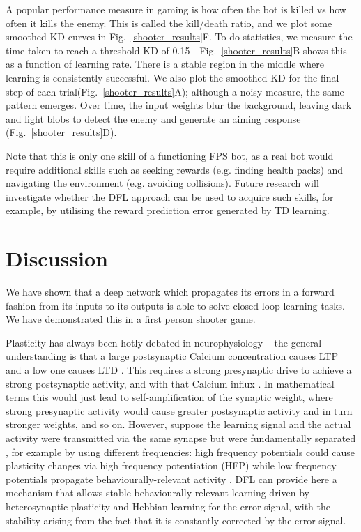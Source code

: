 \documentclass{article}
\begin{document}
A popular performance measure in gaming is how often the bot is killed
vs how often it kills the enemy. This is called the kill/death ratio,
and we plot some smoothed KD curves in Fig.~\ref{shooter_results}F. To
do statistics, we measure the time taken to reach a threshold KD of
0.15 - Fig.~\ref{shooter_results}B shows this as a function of
learning rate. There is a stable region in the middle where
learning is consistently successful. We also plot the smoothed KD for
the final step of each trial(Fig.~\ref{shooter_results}A); although a
noisy measure, the same pattern emerges. Over time, the input weights
blur the background, leaving dark and light blobs to detect the enemy
and generate an aiming response (Fig.~\ref{shooter_results}D).

Note that this is only one skill of a functioning FPS bot, as a real
bot would require additional skills such as seeking rewards
(e.g. finding health packs) and navigating the environment
(e.g. avoiding collisions). Future research will investigate whether
the DFL approach can be used to acquire such skills, for example,
by utilising the reward prediction error generated by TD learning.


\section{Discussion}
We have shown that a deep network which propagates its errors in a
forward fashion from its inputs to its outputs is able to solve closed
loop learning tasks. We have demonstrated this in a first person
shooter game.

Plasticity has always been hotly debated in neurophysiology -- the
general understanding is that a large postsynaptic Calcium
concentration causes LTP \cite{Malenka99,Bennett2000} and a low one
causes LTD \cite{Mulkey1992}. This requires a strong presynaptic drive
to achieve a strong postsynaptic activity, and with that Calcium
influx \cite{Meunier2017}. In mathematical terms this would just lead
to self-amplification of the synaptic weight, where strong presynaptic
activity would cause greater postsynaptic activity and in turn
stronger weights, and so on. However, suppose the learning signal and
the actual activity were transmitted via the same synapse but were
fundamentally separated \cite{Lindsay2017}, for example by using
different frequencies: high frequency potentials could cause
plasticity changes via high frequency potentiation (HFP) while low
frequency potentials propagate behaviourally-relevant activity
\cite{Canolty2010}. DFL can provide here a mechanism that allows
stable behaviourally-relevant learning driven by heterosynaptic
plasticity and Hebbian learning for the error signal, with the
stability arising from the fact that it is constantly corrected by the
error signal.
\end{document}
